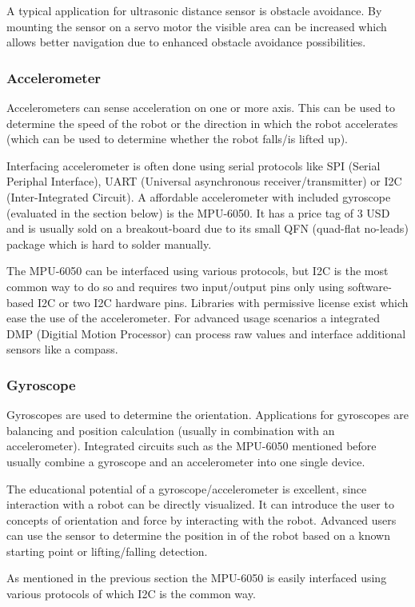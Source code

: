 \documentclass[11pt,a4paper]{article}
\begin{document}
A typical application for ultrasonic distance sensor is obstacle avoidance. By mounting the sensor on a servo motor the visible area can be increased which allows better navigation due to enhanced obstacle avoidance possibilities. 

\subsubsection{Accelerometer}
Accelerometers can sense acceleration on one or more axis. This can be used to determine the speed of the robot or the direction in which the robot accelerates (which can be used to determine whether the robot falls/is lifted up). 

Interfacing accelerometer is often done using serial protocols like SPI (Serial Periphal Interface), UART (Universal asynchronous receiver/transmitter) or I2C (Inter-Integrated Circuit). A affordable accelerometer with included gyroscope (evaluated in the section below) is the MPU-6050. It has a price tag of 3 USD and is usually sold on a breakout-board due to its small QFN (quad-flat no-leads) package which is hard to solder manually. 

The MPU-6050 can be interfaced using various protocols, but I2C is the most common way to do so and requires two input/output pins only using software-based I2C or two I2C hardware pins. Libraries with permissive license exist which ease the use of the accelerometer. For advanced usage scenarios a integrated DMP (Digitial Motion Processor) can process raw values and interface additional sensors like a compass.
\subsubsection{Gyroscope}
Gyroscopes are used to determine the orientation. Applications for gyroscopes are balancing and position calculation (usually in combination with an accelerometer). Integrated circuits such as the MPU-6050 mentioned before usually combine a gyroscope and an accelerometer into one single device.

The educational potential of a gyroscope/accelerometer is excellent, since interaction with a robot can be directly visualized. It can introduce the user to concepts of orientation and force by interacting with the robot. Advanced users can use the sensor to determine the position in of the robot based on a known starting point or lifting/falling detection.

As mentioned in the previous section the MPU-6050 is easily interfaced using various protocols of which I2C is the common way.
\end{document}
